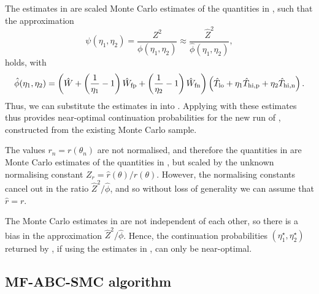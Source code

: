 \documentclass[review,demo]{siamonline190516}
\begin{document}
The estimates in  are scaled Monte Carlo estimates of the quantities in , such that the approximation
\[
\psi(\eta_1,\eta_2) = \frac{Z^2}{\phi(\eta_1,\eta_2)} \approx \frac{\hat Z^2}{\hat \phi(\eta_1,\eta_2)},
\]
holds, with
\begin{equation}
\label{eq:PhiHat}
\hat \phi(\eta_1, \eta_2) = 
\left(  \hat W + \left( \frac{1}{\eta_1} - 1 \right) \fp{\hat W} + \left( \frac{1}{\eta_2} - 1 \right) \fn{\hat W} \right)
\left( \hat{T}_{\mathrm{lo}}
 + \eta_1 \hat T_{\mathrm{hi}, \mathrm p}
 + \eta_2 \hat T_{\mathrm{hi}, \mathrm n} \right).
\end{equation}
Thus, we can substitute the estimates in  into .
Applying  with these estimates thus provides near-optimal continuation probabilities for the new run of , constructed from the existing Monte Carlo sample.

\begin{note}
The values $r_n = r(\theta_n)$ are not normalised, and therefore the quantities in  are Monte Carlo estimates of the quantities in , but scaled by the unknown normalising constant $Z_r = \hat r(\theta)/r(\theta)$.
However, the normalising constants cancel out in the ratio $\hat Z^2/\hat \phi$, and so without loss of generality we can assume that $\hat r = r$.
\end{note}

\begin{note}
The Monte Carlo estimates in  are not independent of each other, so there is a bias in the approximation $\hat Z^2 / \hat \phi$.
Hence, the continuation probabilities $(\eta_1^\star, \eta_2^\star)$ returned by , if using the estimates in , can only be near-optimal. 
\end{note}


\subsection{MF-ABC-SMC algorithm}
\label{s:MFABC:SMC}
\end{document}
